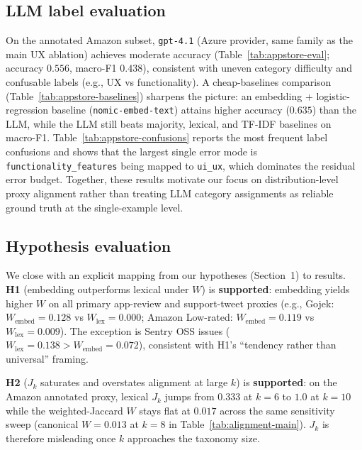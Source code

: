 \subsection{LLM label evaluation}
On the annotated Amazon subset, \texttt{gpt-4.1} (Azure provider, same family as the main UX ablation) achieves moderate accuracy (Table~\ref{tab:appstore-eval}; accuracy $0.556$, macro-F1 $0.438$), consistent with uneven category difficulty and confusable labels (e.g., UX vs functionality). A cheap-baselines comparison (Table~\ref{tab:appstore-baselines}) sharpens the picture: an embedding + logistic-regression baseline (\texttt{nomic-embed-text}) attains higher accuracy ($0.635$) than the LLM, while the LLM still beats majority, lexical, and TF-IDF baselines on macro-F1. Table~\ref{tab:appstore-confusions} reports the most frequent label confusions and shows that the largest single error mode is \texttt{functionality\_features} being mapped to \texttt{ui\_ux}, which dominates the residual error budget.
Together, these results motivate our focus on distribution-level proxy alignment rather than treating LLM category assignments as reliable ground truth at the single-example level.

\subsection{Hypothesis evaluation}
We close with an explicit mapping from our hypotheses (Section~1) to results.
\textbf{H1} (embedding outperforms lexical under $W$) is \textbf{supported}: embedding yields higher $W$ on all primary app-review and support-tweet proxies
(e.g., Gojek: $W_\text{embed}=0.128$ vs $W_\text{lex}=0.000$; Amazon Low-rated: $W_\text{embed}=0.119$ vs $W_\text{lex}=0.009$).
The exception is Sentry OSS issues ($W_\text{lex}=0.138 > W_\text{embed}=0.072$), consistent with H1's ``tendency rather than universal'' framing.

\textbf{H2} ($J_k$ saturates and overstates alignment at large $k$) is \textbf{supported}: on the Amazon annotated proxy, lexical $J_k$ jumps from $0.333$ at $k=6$ to $1.0$ at $k=10$ while the weighted-Jaccard $W$ stays flat at $0.017$ across the same sensitivity sweep (canonical $W=0.013$ at $k=8$ in Table~\ref{tab:alignment-main}). $J_k$ is therefore misleading once $k$ approaches the taxonomy size.

